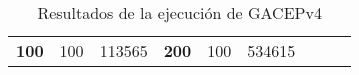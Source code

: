 \begin{table}[H]
\begin{tabular}{|ccrccrccc}
\multicolumn{1}{|c|}{\multirow{-39}{*}{\cellcolor[HTML]{FFFFC7}\textbf{100}}} & \multicolumn{1}{c|}{\multirow{-9}{*}{\cellcolor[HTML]{DDFDFF}100}} & \multicolumn{1}{r|}{\cellcolor[HTML]{DAE8FC}113565}    & \multicolumn{1}{c|}{\multirow{-39}{*}{\cellcolor[HTML]{FFFFC7}\textbf{200}}} & \multicolumn{1}{c|}{\multirow{-10}{*}{\cellcolor[HTML]{DDFDFF}100}} & \multicolumn{1}{r|}{\cellcolor[HTML]{DDFDFF}534615}    &                                                                              &                                                                    &                                                        \\ \cline{1-6}
\end{tabular}
\caption{\label{res:GACEPv4}Resultados de la ejecución de GACEPv4}
\end{table}

